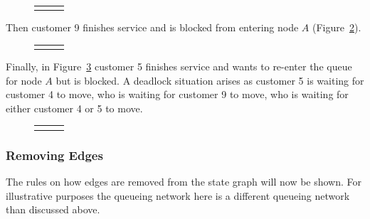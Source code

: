 \documentclass{article}
\begin{document}
\begin{figure}[H]
  \begin{tabular}{ c c c }
       & \hspace{0.1\textwidth} &
       \\
  \end{tabular}
  \caption{}
  \label{fig:general_buildup_3}
\end{figure}

Then customer 9 finishes service and is blocked from entering node $A$ (Figure~\ref{fig:general_buildup_4}).

\begin{figure}[H]
  \begin{tabular}{ c c c }
       & \hspace{0.1\textwidth} &
       \\
  \end{tabular}
  \caption{}
  \label{fig:general_buildup_4}
\end{figure}

Finally, in Figure~\ref{fig:general_buildup_5} customer 5 finishes service and wants to re-enter the queue for node $A$ but is blocked.
A deadlock situation arises as customer 5 is waiting for customer 4 to move, who is waiting for customer 9 to move, who is waiting for either customer 4 or 5 to move.

\begin{figure}[H]
  \begin{tabular}{ c c c }
       & \hspace{0.1\textwidth} &
       \\
  \end{tabular}
  \caption{}
  \label{fig:general_buildup_5}
\end{figure}



\subsubsection{Removing Edges}

The rules on how edges are removed from the state graph will now be shown.
For illustrative purposes the queueing network here is a different queueing network than discussed above.
\end{document}

